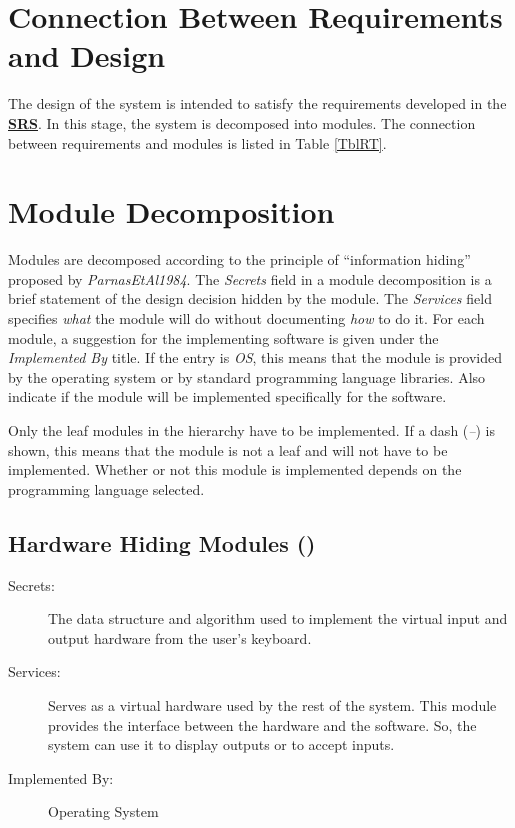 \documentclass[12pt, titlepage]{article}
\begin{document}
\section{Connection Between Requirements and Design} \label{SecConnection}

The design of the system is intended to satisfy the requirements developed in
the \href{https://gitlab.cas.mcmaster.ca/chowdr11/3xa3/-/blob/master/BlankProjectTemplate/Doc/SRS/SRS.pdf}
{\textbf{SRS}}. In this stage, the system is decomposed into modules. The connection
between requirements and modules is listed in Table \ref{TblRT}.

\section{Module Decomposition} \label{SecMD}

Modules are decomposed according to the principle of ``information hiding''
proposed by \textit{ParnasEtAl1984}. The \emph{Secrets} field in a module
decomposition is a brief statement of the design decision hidden by the
module. The \emph{Services} field specifies \emph{what} the module will do
without documenting \emph{how} to do it. For each module, a suggestion for the
implementing software is given under the \emph{Implemented By} title. If the
entry is \emph{OS}, this means that the module is provided by the operating
system or by standard programming language libraries.  Also indicate if the
module will be implemented specifically for the software.

Only the leaf modules in the
hierarchy have to be implemented. If a dash (\emph{--}) is shown, this means
that the module is not a leaf and will not have to be implemented. Whether or
not this module is implemented depends on the programming language
selected.

\subsection{Hardware Hiding Modules ()}

\begin{description}
\item[Secrets:]The data structure and algorithm used to implement the virtual input and output
  hardware from the user's keyboard.
\item[Services:]Serves as a virtual hardware used by the rest of the
  system. This module provides the interface between the hardware and the
  software. So, the system can use it to display outputs or to accept inputs.
\item[Implemented By:] Operating System
\end{description}
\end{document}
